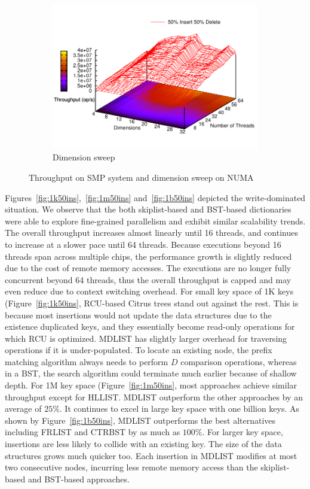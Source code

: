 \documentclass[10pt,conference,compsocconf]{IEEEtran}
\begin{document}
\begin{figure}[t]
\begin{subfigure}{0.32\textwidth}
        \includegraphics[width=1\columnwidth]{./data/amdsweep50ins}
      \caption{Dimension sweep}
        \label{fig:sweep}
    \end{subfigure}
    \caption{Throughput on SMP system and dimension sweep on NUMA}
    \label{fig:intel}
    \vspace{-0.2in}
\end{figure}

Figures~\ref{fig:1k50ins},~\ref{fig:1m50ins} and~\ref{fig:1b50ins} depicted the write-dominated situation.
We observe that the both skiplist-based and BST-based dictionaries were able to explore fine-grained parallelism and exhibit similar scalability trends.
The overall throughput increases almost linearly until 16 threads, and continues to increase at a slower pace until 64 threads.
Because executions beyond 16 threads span across multiple chips, the performance growth is slightly reduced due to the cost of remote memory accesses.
The executions are no longer fully concurrent beyond 64 threads, thus the overall throughput is capped and may even reduce due to context switching overhead.
For small key space of 1K keys (Figure~\ref{fig:1k50ins}, RCU-based Citrus trees stand out against the rest.
This is because most insertions would not update the data structures due to the existence duplicated keys, and they essentially become read-only operations for which RCU is optimized.
MDLIST has slightly larger overhead for traversing operations if it is under-populated. 
To locate an existing node, the prefix matching algorithm always needs to perform $D$ comparison operations, whereas in a BST, the search algorithm could terminate much earlier because of shallow depth.
For 1M key space (Figure~\ref{fig:1m50ins}, most approaches achieve similar throughput except for HLLIST.
MDLIST outperform the other approaches by an average of $25\%$.
It continues to excel in large key space with one billion keys.
As shown by Figure~\ref{fig:1b50ins}, MDLIST outperforms the best alternatives including FRLIST and CTRBST by as much as $100\%$. 
For larger key space, insertions are less likely to collide with an existing key.
The size of the data structures grows much quicker too.
Each insertion in MDLIST modifies at most two consecutive nodes, incurring less remote memory access than the skiplist-based and BST-based approaches.
\end{document}
